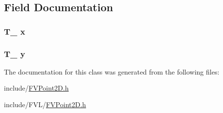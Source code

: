 \subsection{Field Documentation}
\hypertarget{classFVPoint2D_a4333b1040efe8cd32f7c76bfc2269e0d}{
\subsubsection[{x}]{\setlength{\rightskip}{0pt plus 5cm}T\_\- {\bf x}}}
\label{d7/dbe/classFVPoint2D_a4333b1040efe8cd32f7c76bfc2269e0d}
\hypertarget{classFVPoint2D_ab4943c75e718fe503722ac7d26c746a6}{
\subsubsection[{y}]{\setlength{\rightskip}{0pt plus 5cm}T\_\- {\bf y}}}
\label{d7/dbe/classFVPoint2D_ab4943c75e718fe503722ac7d26c746a6}


The documentation for this class was generated from the following files:\begin{DoxyCompactItemize}
\item 
include/\hyperlink{FVPoint2D_8h}{FVPoint2D.h}\item 
include/FVL/\hyperlink{FVL_2FVPoint2D_8h}{FVPoint2D.h}\end{DoxyCompactItemize}
